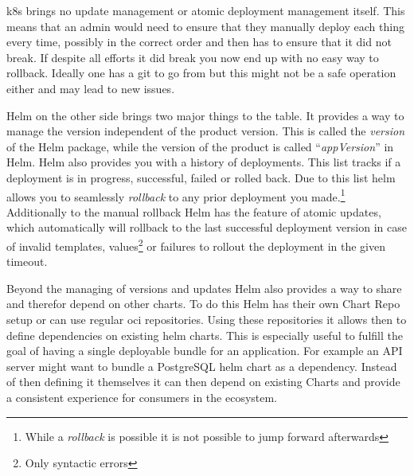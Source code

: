 \Gls{k8s} brings no update management or atomic deployment management itself.
This means that an admin would need to ensure that they manually deploy each thing every time, possibly in the correct order and then has to ensure that it did not break.
If despite all efforts it did break you now end up with no easy way to rollback.
Ideally one has a git to go from but this might not be a safe operation either and may lead to new issues.

Helm on the other side brings two major things to the table.
It provides a way to manage the version independent of the product version.
This is called the \emph{version} of the Helm package, while the version of the product is called \enquote{\emph{appVersion}} in Helm.
Helm also provides you with a history of deployments.
This list tracks if a deployment is in progress, successful, failed or rolled back.
Due to this list helm allows you to seamlessly \emph{rollback} to any prior deployment you made.\footnote{While a \emph{rollback} is possible it is not possible to jump forward afterwards}
Additionally to the manual rollback Helm has the feature of atomic updates, which automatically will rollback to the last successful deployment version in case of invalid templates, values\footnote{Only syntactic errors} or failures to rollout the deployment in the given timeout.

Beyond the managing of versions and updates Helm also provides a way to share and therefor depend on other charts.
To do this Helm has their own Chart Repo setup or can use regular \gls{oci} repositories.
Using these repositories it allows then to define dependencies on existing helm charts.
This is especially useful to fulfill the goal of having a single deployable bundle for an application.
For example an API server might want to bundle a PostgreSQL helm chart as a dependency.
Instead of then defining it themselves it can then depend on existing Charts and provide a consistent experience for consumers in the ecosystem.
